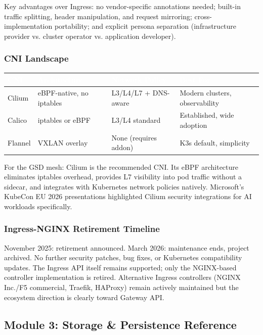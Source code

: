 \documentclass[11pt,letterpaper]{article}
\newcommand{\tableheader}[1]{\textbf{\sffamily\textcolor{white}{#1}}}
\begin{document}
Key advantages over Ingress: no vendor-specific annotations needed; built-in traffic splitting, header manipulation, and request mirroring; cross-implementation portability; and explicit persona separation (infrastructure provider vs. cluster operator vs. application developer).

\subsubsection{CNI Landscape}

\begin{center}
\begin{tabularx}{\textwidth}{L{2.5cm}XXX}
\toprule
{}
\tableheader{CNI} & \tableheader{Architecture} & \tableheader{Network Policy} & \tableheader{Best For} \\
\midrule
Cilium & eBPF-native, no iptables & L3/L4/L7 + DNS-aware & Modern clusters, observability \\
Calico & iptables or eBPF & L3/L4 standard & Established, wide adoption \\
Flannel & VXLAN overlay & None (requires addon) & K3s default, simplicity \\
\bottomrule
\end{tabularx}
\end{center}

For the GSD mesh: Cilium is the recommended CNI. Its eBPF architecture eliminates iptables overhead, provides L7 visibility into pod traffic without a sidecar, and integrates with Kubernetes network policies natively. Microsoft's KubeCon EU 2026 presentations highlighted Cilium security integrations for AI workloads specifically.

\subsubsection{Ingress-NGINX Retirement Timeline}
November 2025: retirement announced. March 2026: maintenance ends, project archived. No further security patches, bug fixes, or Kubernetes compatibility updates. The Ingress API itself remains supported; only the NGINX-based controller implementation is retired. Alternative Ingress controllers (NGINX Inc./F5 commercial, Traefik, HAProxy) remain actively maintained but the ecosystem direction is clearly toward Gateway API.

\subsection{Module 3: Storage \& Persistence Reference}
\end{document}
